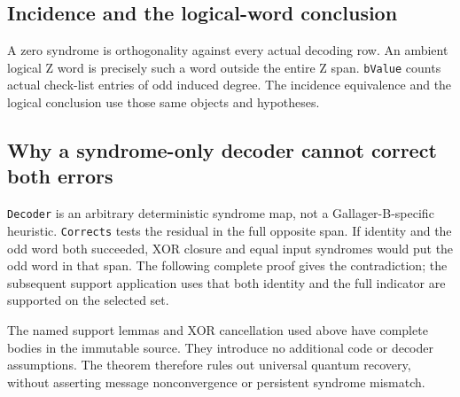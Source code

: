 \subsection{Incidence and the logical-word conclusion}
A zero syndrome is orthogonality against every actual decoding row. An ambient logical Z word is precisely such a word outside the entire Z span. \texttt{bValue} counts actual check-list entries of odd induced degree. The incidence equivalence and the logical conclusion use those same objects and hypotheses.









\subsection{Why a syndrome-only decoder cannot correct both errors}
\texttt{Decoder} is an arbitrary deterministic syndrome map, not a Gallager-B-specific heuristic. \texttt{Corrects} tests the residual in the full opposite span. If identity and the odd word both succeeded, XOR closure and equal input syndromes would put the odd word in that span. The following complete proof gives the contradiction; the subsequent support application uses that both identity and the full indicator are supported on the selected set.






The named support lemmas and XOR cancellation used above have complete bodies in the immutable source. They introduce no additional code or decoder assumptions. The theorem therefore rules out universal quantum recovery, without asserting message nonconvergence or persistent syndrome mismatch.

